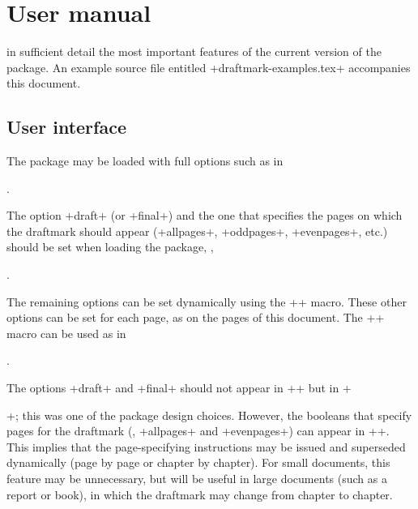 \documentclass[a4paper,11pt,final]{article}
\begin{document}
\section {User manual}
 in sufficient detail the most important features of the current version of the package. An example source file entitled +draftmark-examples.tex+ accompanies this document.

\subsection{User interface}
The package may be loaded with full options such as in

\begin{dmverbatim}
\usepackage[draft=true,allpages=true,fontfamily=pag,color=gray,
  grayness=0.8,mark=DRAFT,angle=45,scale=0.8,
  xcoord=0,ycoord=0]{draftmark}

\usepackage[draft,pages=1-4,fontfamily=phv,color=red!55!yellow!50,
  mark=CONFIDENTIAL,angle=55,scale=0.8,
  xcoord=20,ycoord=10]{draftmark}.
\end{dmverbatim}

The option +draft+ (or +final+) and the one that specifies the pages on which the draftmark should appear (+allpages+, +oddpages+, +evenpages+, etc.\@) should be set when loading the package, \eg,

\begin{dmverbatim}
\usepackage[draft,evenpages]{draftmark}.
\end{dmverbatim}

The remaining options can be set dynamically using the +\draftmarksetup+ macro. These other options can be set for each page, as on the pages of this document. The +\draftmarksetup+ macro can be used as in

\begin{dmverbatim}
.
\end{dmverbatim}

The options +draft+ and +final+ should not appear in +\draftmarksetup+ but in +\usepackage[draft]{draftmark}+; this was one of the package design choices. However, the booleans that specify pages for the draftmark (\eg, +allpages+ and  +evenpages+) can appear in +\draftmarksetup+. This implies that the page-specifying instructions may be issued and superseded dynamically (page by page or chapter by chapter). For small documents, this feature may be unnecessary, but will be useful in large documents (such as a report or book), in which the draftmark may change from chapter to chapter.
\end{document}
